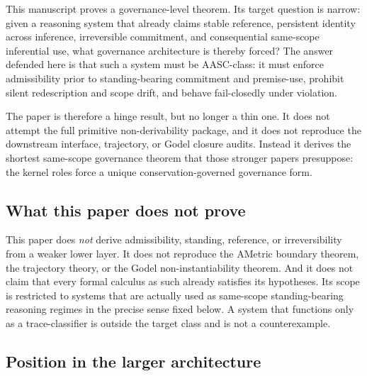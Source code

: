 \documentclass[11pt]{article}
\begin{document}
This manuscript proves a governance-level theorem. Its target question is narrow: given a reasoning system that already claims stable reference, persistent identity across inference, irreversible commitment, and consequential same-scope inferential use, what governance architecture is thereby forced? The answer defended here is that such a system must be AASC-class: it must enforce admissibility prior to standing-bearing commitment and premise-use, prohibit silent redescription and scope drift, and behave fail-closedly under violation.

The paper is therefore a hinge result, but no longer a thin one. It does not attempt the full primitive non-derivability package, and it does not reproduce the downstream interface, trajectory, or Godel closure audits. Instead it derives the shortest same-scope governance theorem that those stronger papers presuppose: the kernel roles force a unique conservation-governed governance form.

\subsection{What this paper does not prove}

This paper does \emph{not} derive admissibility, standing, reference, or irreversibility from a weaker lower layer. It does not reproduce the AMetric boundary theorem, the trajectory theory, or the Godel non-instantiability theorem. And it does not claim that every formal calculus as such already satisfies its hypotheses. Its scope is restricted to systems that are actually used as same-scope standing-bearing reasoning regimes in the precise sense fixed below. A system that functions only as a trace-classifier is outside the target class and is not a counterexample.

\subsection{Position in the larger architecture}
\end{document}

